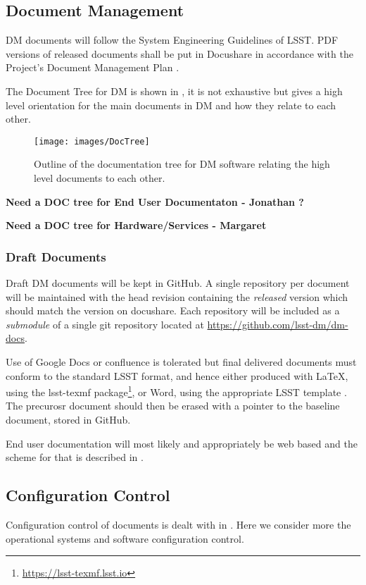 \subsection {Document Management} \label{sect:docman}

DM documents will follow the System Engineering Guidelines of LSST. PDF versions of released documents shall be put in Docushare in accordance with the Project's Document Management Plan .

The Document Tree for DM is shown in , it is not exhaustive but gives a high level orientation for the main documents in DM and how they relate to each other.

\begin{figure}
\begin{center}
 \texttt{[image: images/DocTree]}
\caption{Outline of the documentation tree for DM software relating the high level documents to each other. \label{fig:doctree}}
\end{center}
\end{figure}


{\bf Need a DOC tree for End User Documentaton - Jonathan ?}

{\bf Need a DOC tree for Hardware/Services  - Margaret }

\subsubsection{Draft Documents}
Draft DM documents will be kept in GitHub. A single repository per document will be maintained with the head revision containing the {\em released } version which should match the version on docushare. Each repository will be included as a {\em submodule} of a single git repository located at \url{https://github.com/lsst-dm/dm-docs}.

Use of Google Docs or confluence is tolerated but final delivered documents must conform to the standard LSST format, and hence either produced with LaTeX, using the lsst-texmf package\footnote{\url{https://lsst-texmf.lsst.io}}, or Word, using the appropriate LSST template . The precurosr document should then be erased with a pointer to the baseline document, stored in GitHub.

End user documentation will most likely and appropriately be web based and the scheme for that is described in .

\subsection {Configuration Control} \label{sect:config}
Configuration control of documents is dealt with in . Here we consider more the operational systems and software configuration control.


